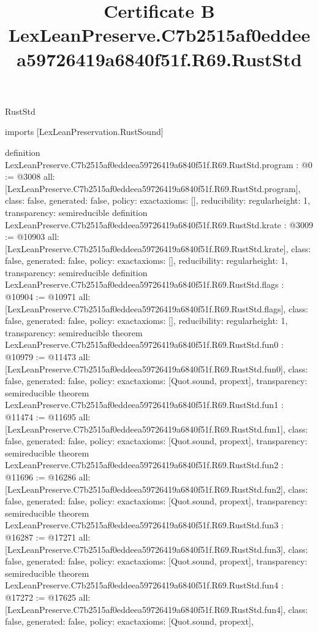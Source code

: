 \begin{lexlean}{RustStd}
\title{Certificate B LexLeanPreserve.C7b2515af0eddeea59726419a6840f51f.R69.RustStd}
\begin{coremodule}
imports [LexLeanPreservation.RustSound]

definition LexLeanPreserve.C7b2515af0eddeea59726419a6840f51f.R69.RustStd.program : @0 := @3008 {
  all: [LexLeanPreserve.C7b2515af0eddeea59726419a6840f51f.R69.RustStd.program],
  class: false,
  generated: false,
  policy: exact{axioms: []},
  reducibility: regular{height: 1},
  transparency: semireducible
}
definition LexLeanPreserve.C7b2515af0eddeea59726419a6840f51f.R69.RustStd.krate : @3009 := @10903 {
  all: [LexLeanPreserve.C7b2515af0eddeea59726419a6840f51f.R69.RustStd.krate],
  class: false,
  generated: false,
  policy: exact{axioms: []},
  reducibility: regular{height: 1},
  transparency: semireducible
}
definition LexLeanPreserve.C7b2515af0eddeea59726419a6840f51f.R69.RustStd.flags : @10904 := @10971 {
  all: [LexLeanPreserve.C7b2515af0eddeea59726419a6840f51f.R69.RustStd.flags],
  class: false,
  generated: false,
  policy: exact{axioms: []},
  reducibility: regular{height: 1},
  transparency: semireducible
}
theorem LexLeanPreserve.C7b2515af0eddeea59726419a6840f51f.R69.RustStd.fun0 : @10979 := @11473 {
  all: [LexLeanPreserve.C7b2515af0eddeea59726419a6840f51f.R69.RustStd.fun0],
  class: false,
  generated: false,
  policy: exact{axioms: [Quot.sound, propext]},
  transparency: semireducible
}
theorem LexLeanPreserve.C7b2515af0eddeea59726419a6840f51f.R69.RustStd.fun1 : @11474 := @11695 {
  all: [LexLeanPreserve.C7b2515af0eddeea59726419a6840f51f.R69.RustStd.fun1],
  class: false,
  generated: false,
  policy: exact{axioms: [Quot.sound, propext]},
  transparency: semireducible
}
theorem LexLeanPreserve.C7b2515af0eddeea59726419a6840f51f.R69.RustStd.fun2 : @11696 := @16286 {
  all: [LexLeanPreserve.C7b2515af0eddeea59726419a6840f51f.R69.RustStd.fun2],
  class: false,
  generated: false,
  policy: exact{axioms: [Quot.sound, propext]},
  transparency: semireducible
}
theorem LexLeanPreserve.C7b2515af0eddeea59726419a6840f51f.R69.RustStd.fun3 : @16287 := @17271 {
  all: [LexLeanPreserve.C7b2515af0eddeea59726419a6840f51f.R69.RustStd.fun3],
  class: false,
  generated: false,
  policy: exact{axioms: [Quot.sound, propext]},
  transparency: semireducible
}
theorem LexLeanPreserve.C7b2515af0eddeea59726419a6840f51f.R69.RustStd.fun4 : @17272 := @17625 {
  all: [LexLeanPreserve.C7b2515af0eddeea59726419a6840f51f.R69.RustStd.fun4],
  class: false,
  generated: false,
  policy: exact{axioms: [Quot.sound, propext]},
}
\end{coremodule}
\end{lexlean}
